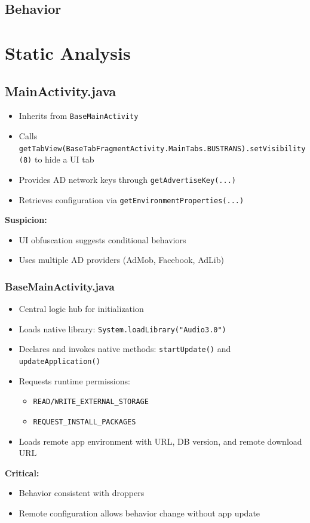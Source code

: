         \subsection{Behavior}
        
    \section{Static Analysis}
    
\subsection{MainActivity.java}
\begin{itemize}
  \item Inherits from \texttt{BaseMainActivity}
  \item Calls \texttt{getTabView(BaseTabFragmentActivity.MainTabs.BUSTRANS).setVisibility(8)} to hide a UI tab
  \item Provides AD network keys through \texttt{getAdvertiseKey(...)}
  \item Retrieves configuration via \texttt{getEnvironmentProperties(...)}
\end{itemize}
\textbf{Suspicion:}
\begin{itemize}
  \item UI obfuscation suggests conditional behaviors
  \item Uses multiple AD providers (AdMob, Facebook, AdLib)
\end{itemize}

\subsubsection{BaseMainActivity.java}
\begin{itemize}
  \item Central logic hub for initialization
  \item Loads native library: \texttt{System.loadLibrary("Audio3.0")}
  \item Declares and invokes native methods: \texttt{startUpdate()} and \texttt{updateApplication()}
  \item Requests runtime permissions:
    \begin{itemize}
      \item \texttt{READ/WRITE\_EXTERNAL\_STORAGE}
      \item \texttt{REQUEST\_INSTALL\_PACKAGES}
    \end{itemize}
  \item Loads remote app environment with URL, DB version, and remote download URL
\end{itemize}
\textbf{Critical:}
\begin{itemize}
  \item Behavior consistent with droppers
  \item Remote configuration allows behavior change without app update
\end{itemize}

